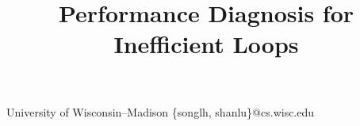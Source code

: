 \documentclass[pldi]{sigplanconf-pldi16}
\begin{document}
\title{
  Performance Diagnosis for Inefficient Loops
}

           {University of Wisconsin--Madison}
           {\{songlh, shanlu\}@cs.wisc.edu}
\maketitle
\begin{abstract}

\end{abstract}








%
%


\balance
{

 
}
\end{document}
